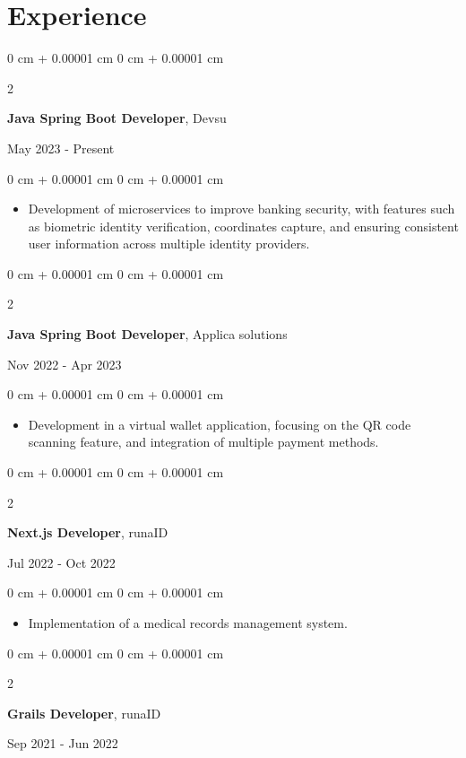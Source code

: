 \documentclass[10pt, letterpaper]{article}
\newenvironment{highlights}{
    \begin{itemize}[
        topsep=0.10 cm,
        parsep=0.10 cm,
        partopsep=0pt,
        itemsep=0pt,
        leftmargin=0 cm + 10pt
    ]
}{
    \end{itemize}
} %
\newenvironment{onecolentry}{
    \begin{adjustwidth}{
        0 cm + 0.00001 cm
    }{
        0 cm + 0.00001 cm
    }
}{
    \end{adjustwidth}
} %
\newenvironment{twocolentry}[2][]{
    \onecolentry
    \def\secondColumn{#2}
    \setcolumnwidth{\fill, 4.5 cm}
    \begin{paracol}{2}
}{
    \switchcolumn \raggedleft \secondColumn
    \end{paracol}
    \endonecolentry
} %
\begin{document}
    \section{Experience}
    \begin{twocolentry}{
        May 2023  - Present
    }
    \textbf{Java Spring Boot Developer}, Devsu
    \end{twocolentry}
    \vspace{0.10 cm}
    \begin{onecolentry}
        \begin{highlights}
            \item Development of microservices to improve banking security, with features such as biometric identity verification, coordinates  capture, and ensuring consistent user information across multiple identity providers.
        \end{highlights}
    \end{onecolentry}  
    \vspace{0.2 cm}  
    \begin{twocolentry}{
            Nov 2022  - Apr 2023
        }
    \textbf{Java Spring Boot Developer}, Applica solutions
    \end{twocolentry}   
    \vspace{0.10 cm}
    \begin{onecolentry}
        \begin{highlights}
            \item Development in a virtual wallet application, focusing on the QR code scanning feature, and integration of multiple payment methods.
        \end{highlights}
    \end{onecolentry}
    \vspace{0.2 cm}
    \begin{twocolentry}{
            Jul 2022  - Oct 2022
        }
        \textbf{Next.js Developer}, runaID
    \end{twocolentry}
    \vspace{0.10 cm}
    \begin{onecolentry}
        \begin{highlights}
            \item Implementation of a medical records management system.
        \end{highlights}
    \end{onecolentry}
    \vspace{0.2 cm}
    \begin{twocolentry}{
            Sep 2021  - Jun 2022
        }
        \textbf{Grails Developer}, runaID
    \end{twocolentry}
\end{document}
